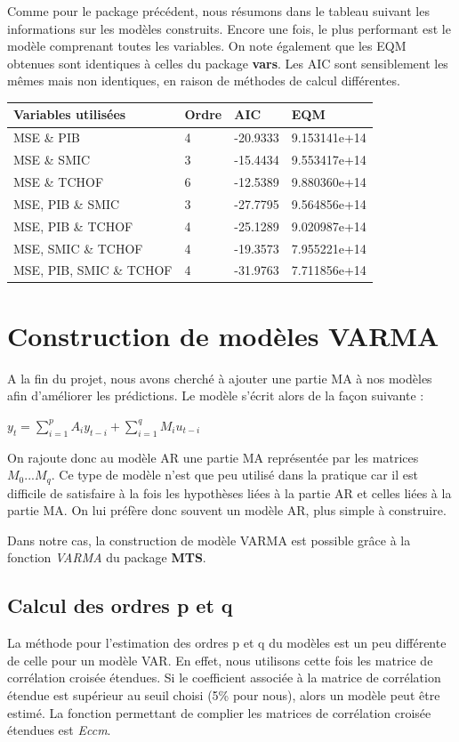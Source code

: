 \documentclass[11pt,]{article}
\begin{document}
Comme pour le package précédent, nous résumons dans le tableau suivant
les informations sur les modèles construits. Encore une fois, le plus
performant est le modèle comprenant toutes les variables. On note
également que les EQM obtenues sont identiques à celles du package
\textbf{vars}. Les AIC sont sensiblement les mêmes mais non identiques,
en raison de méthodes de calcul différentes.

\begin{longtable}[]{@{}llll@{}}
\toprule
Variables utilisées & Ordre & AIC & EQM\tabularnewline
\midrule
\endhead
MSE \& PIB & 4 & -20.9333 & 9.153141e+14\tabularnewline
MSE \& SMIC & 3 & -15.4434 & 9.553417e+14\tabularnewline
MSE \& TCHOF & 6 & -12.5389 & 9.880360e+14\tabularnewline
MSE, PIB \& SMIC & 3 & -27.7795 & 9.564856e+14\tabularnewline
MSE, PIB \& TCHOF & 4 & -25.1289 & 9.020987e+14\tabularnewline
MSE, SMIC \& TCHOF & 4 & -19.3573 & 7.955221e+14\tabularnewline
MSE, PIB, SMIC \& TCHOF & 4 & -31.9763 & 7.711856e+14\tabularnewline
\bottomrule
\end{longtable}

\section{Construction de modèles
VARMA}\label{construction-de-modeles-varma}

A la fin du projet, nous avons cherché à ajouter une partie MA à nos
modèles afin d'améliorer les prédictions. Le modèle s'écrit alors de la
façon suivante :

\(y_t = \sum_{i = 1}^{p} {A_iy_{t-i}} + \sum_{i = 1}^{q}{M_iu_{t-i}}\)

On rajoute donc au modèle AR une partie MA représentée par les matrices
\(M_0 ... M_q\). Ce type de modèle n'est que peu utilisé dans la
pratique car il est difficile de satisfaire à la fois les hypothèses
liées à la partie AR et celles liées à la partie MA. On lui préfère donc
souvent un modèle AR, plus simple à construire.

Dans notre cas, la construction de modèle VARMA est possible grâce à la
fonction \emph{VARMA} du package \textbf{MTS}.

\subsection{Calcul des ordres p et q}\label{calcul-des-ordres-p-et-q}

La méthode pour l'estimation des ordres p et q du modèles est un peu
différente de celle pour un modèle VAR. En effet, nous utilisons cette
fois les matrice de corrélation croisée étendues. Si le coefficient
associée à la matrice de corrélation étendue est supérieur au seuil
choisi (5\% pour nous), alors un modèle peut être estimé. La fonction
permettant de complier les matrices de corrélation croisée étendues est
\emph{Eccm}.
\end{document}
